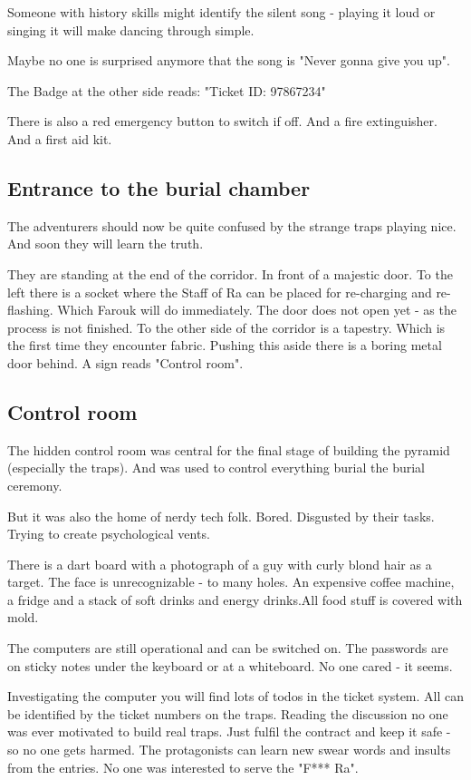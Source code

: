 Someone with history skills might identify the silent song - playing it loud or singing it will make dancing through simple.

Maybe no one is surprised anymore that the song is "Never gonna give you up".

The Badge at the other side reads: "Ticket ID: 97867234"

There is also a red emergency button to switch if off. And a fire extinguisher. And a first aid kit.

\subsection{Entrance to the burial chamber}

The adventurers should now be quite confused by the strange traps playing nice. And soon they will learn the truth.

They are standing at the end of the corridor. In front of a majestic door. To the left there is a socket where the Staff of Ra can be placed for re-charging and re-flashing. Which Farouk will do immediately. The door does not open yet - as the process is not finished.
To the other side of the corridor is a tapestry. Which is the first time they encounter fabric. Pushing this aside there is a boring metal door behind. A sign reads "Control room".

\subsection{Control room}

The hidden control room was central for the final stage of building the pyramid (especially the traps). And was used to control everything burial the burial ceremony.

But it was also the home of nerdy tech folk. Bored. Disgusted by their tasks. Trying to create psychological vents.

There is a dart board with a photograph of a guy with curly blond hair as a target. The face is unrecognizable - to many holes.
An expensive coffee machine, a fridge and a stack of soft drinks and energy drinks.All food stuff is covered with mold.

The computers are still operational and can be switched on. The passwords are on sticky notes under the keyboard or at a whiteboard. No one cared - it seems.

Investigating the computer you will find lots of todos in the ticket system. All can be identified by the ticket numbers on the traps. Reading the discussion no one was ever motivated to build real traps. Just fulfil the contract and keep it safe - so no one gets harmed.
The protagonists can learn new swear words and insults from the entries. No one was interested to serve the "F*** Ra".

